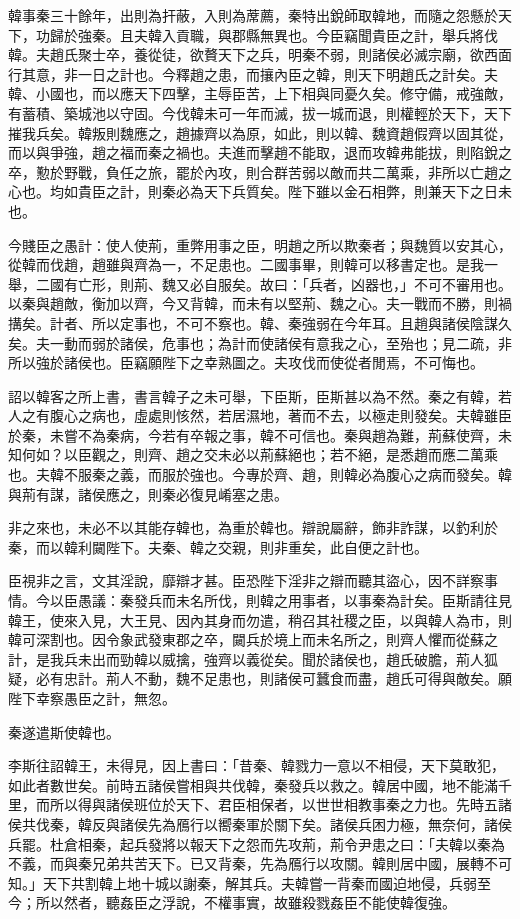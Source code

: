 
\begin{pinyinscope}
韓事秦三十餘年，出則為扞蔽，入則為蓆薦，秦特出銳師取韓地，而隨之怨懸於天下，功歸於強秦。且夫韓入貢職，與郡縣無異也。今臣竊聞貴臣之計，舉兵將伐韓。夫趙氏聚士卒，養從徒，欲贅天下之兵，明秦不弱，則諸侯必滅宗廟，欲西面行其意，非一日之計也。今釋趙之患，而攘內臣之韓，則天下明趙氏之計矣。夫韓、小國也，而以應天下四擊，主辱臣苦，上下相與同憂久矣。修守備，戒強敵，有蓄積、築城池以守固。今伐韓未可一年而滅，拔一城而退，則權輕於天下，天下摧我兵矣。韓叛則魏應之，趙據齊以為原，如此，則以韓、魏資趙假齊以固其從，而以與爭強，趙之福而秦之禍也。夫進而擊趙不能取，退而攻韓弗能拔，則陷銳之卒，懃於野戰，負任之旅，罷於內攻，則合群苦弱以敵而共二萬乘，非所以亡趙之心也。均如貴臣之計，則秦必為天下兵質矣。陛下雖以金石相弊，則兼天下之日未也。

今賤臣之愚計：使人使荊，重弊用事之臣，明趙之所以欺秦者；與魏質以安其心，從韓而伐趙，趙雖與齊為一，不足患也。二國事畢，則韓可以移書定也。是我一舉，二國有亡形，則荊、魏又必自服矣。故曰：「兵者，凶器也，」不可不審用也。以秦與趙敵，衡加以齊，今又背韓，而未有以堅荊、魏之心。夫一戰而不勝，則禍搆矣。計者、所以定事也，不可不察也。韓、秦強弱在今年耳。且趙與諸侯陰謀久矣。夫一動而弱於諸侯，危事也；為計而使諸侯有意我之心，至殆也；見二疏，非所以強於諸侯也。臣竊願陛下之幸熟圖之。夫攻伐而使從者閒焉，不可悔也。

詔以韓客之所上書，書言韓子之未可舉，下臣斯，臣斯甚以為不然。秦之有韓，若人之有腹心之病也，虛處則㤥然，若居濕地，著而不去，以極走則發矣。夫韓雖臣於秦，未嘗不為秦病，今若有卒報之事，韓不可信也。秦與趙為難，荊蘇使齊，未知何如？以臣觀之，則齊、趙之交未必以荊蘇絕也；若不絕，是悉趙而應二萬乘也。夫韓不服秦之義，而服於強也。今專於齊、趙，則韓必為腹心之病而發矣。韓與荊有謀，諸侯應之，則秦必復見崤塞之患。

非之來也，未必不以其能存韓也，為重於韓也。辯說屬辭，飾非詐謀，以釣利於秦，而以韓利闚陛下。夫秦、韓之交親，則非重矣，此自便之計也。

臣視非之言，文其淫說，靡辯才甚。臣恐陛下淫非之辯而聽其盜心，因不詳察事情。今以臣愚議：秦發兵而未名所伐，則韓之用事者，以事秦為計矣。臣斯請往見韓王，使來入見，大王見、因內其身而勿遣，稍召其社稷之臣，以與韓人為市，則韓可深割也。因令象武發東郡之卒，闚兵於境上而未名所之，則齊人懼而從蘇之計，是我兵未出而勁韓以威擒，強齊以義從矣。聞於諸侯也，趙氏破膽，荊人狐疑，必有忠計。荊人不動，魏不足患也，則諸侯可蠶食而盡，趙氏可得與敵矣。願陛下幸察愚臣之計，無忽。

秦遂遣斯使韓也。

李斯往詔韓王，未得見，因上書曰：「昔秦、韓戮力一意以不相侵，天下莫敢犯，如此者數世矣。前時五諸侯嘗相與共伐韓，秦發兵以救之。韓居中國，地不能滿千里，而所以得與諸侯班位於天下、君臣相保者，以世世相教事秦之力也。先時五諸侯共伐秦，韓反與諸侯先為鴈行以嚮秦軍於關下矣。諸侯兵困力極，無奈何，諸侯兵罷。杜倉相秦，起兵發將以報天下之怨而先攻荊，荊令尹患之曰：「夫韓以秦為不義，而與秦兄弟共苦天下。已又背秦，先為鴈行以攻關。韓則居中國，展轉不可知。」天下共割韓上地十城以謝秦，解其兵。夫韓嘗一背秦而國迫地侵，兵弱至今；所以然者，聽姦臣之浮說，不權事實，故雖殺戮姦臣不能使韓復強。


\end{pinyinscope}
